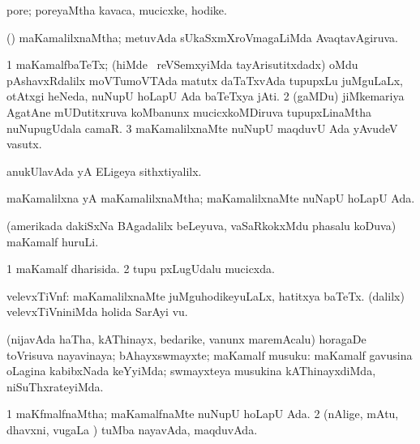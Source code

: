 \bentry
{}
\gl{\nA}
\bmng
 pore; poreyaMtha kavaca, mucicxke, hodike. 
\emng
\eentry

\bentry
{} 
\gl{\gu}
\expl{}
\bmng
(\savi) maKamalilxnaMtha; metuvAda sUkaSxmXroVmagaLiMda AvaqtavAgiruva. 
\emng
\eentry

\bentry
{} 
\gl{\nA}
\expl{}
\bmng
\bnum
\num{1} maKamalfbaTeTx; (hiMde \kanmu\ reVSemxyiMda tayArisutitxdadx) oMdu pAshavxRdalilx moVTumoVTAda matutx daTaTxvAda tupupxLu juMguLaLx, otAtxgi heNeda, nuNupU hoLapU Ada baTeTxya jAti. 
\num{2} (gaMDu) jiMkemariya AgatAne mUDutitxruva koMbanunx mucicxkoMDiruva tupupxLinaMtha nuNupugUdala camaR. 
\num{3} maKamalilxnaMte nuNupU maqduvU Ada yAvudeV vasutx. 
\enum
\emng

\noindent 
\gl{\pagu}
\expl{}
\bmng
  anukUlavAda yA ELigeya sithxtiyalilx. 
\emng
\eentry

\bentry
{} 
\gl{\gu}
\expl{}
\bmng
 maKamalilxna yA maKamalilxnaMtha; maKamalilxnaMte nuNapU hoLapU Ada. 
\emng
\eentry

\bentry
{}
\gl{\nA}
\expl{}
\bmng
 (amerikada dakiSxNa BAgadalilx beLeyuva, vaSaRkokxMdu phasalu koDuva) maKamalf huruLi. 
\emng
\eentry

\bentry
{} 
\gl{\gu}
\expl{}
\bmng
\bnum
\num{1} maKamalf dharisida. 
\num{2} tupu pxLugUdalu mucicxda. 
\enum
\emng
\eentry

\bentry
{} 
\gl{\nA}
\expl{}
\bmng
 velevxTiVnf: 
\banum
{} maKamalilxnaMte juMguhodikeyuLaLx, hatitxya baTeTx. 
 (\bava dalilx) velevxTiVniniMda holida SarAyi \mo vu. 
\eanum
\emng
\eentry

\bentry
{}
\gl{\nA}
\expl{}
\bmng
 (nijavAda haTha, kAThinayx, bedarike, \mo vanunx maremAcalu) horagaDe toVrisuva nayavinaya; bAhayxswmayxte; maKamalf musuku:  maKamalf gavusina oLagina kabibxNada keYyiMda; swmayxteya musukina kAThinayxdiMda, niSuThxrateyiMda. 
\emng
\eentry

\bentry
{} 
\gl{\gu}
\expl{}
\bmng
\bnum
\num{1} maKfmalfnaMtha; maKamalfnaMte nuNupU hoLapU Ada. 
\num{2} (nAlige, mAtu, dhavxni, \mo vugaLa \vi) tuMba nayavAda, maqduvAda. 
\enum
\emng
\eentry

